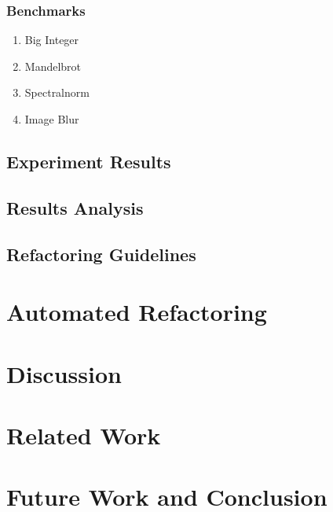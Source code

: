 \documentclass[conference,10pt]{IEEEtran}
\begin{document}
\subsubsection{Benchmarks}

\begin{enumerate}
	\item Big Integer
	\item Mandelbrot
	\item Spectralnorm
	\item Image Blur
\end{enumerate}

\subsection{Experiment Results}
\subsection{Results Analysis}
\subsection{Refactoring Guidelines}

\section{Automated Refactoring} 

\section{Discussion}

\section{Related Work}

\section{Future Work and Conclusion}

%
%
\end{document}
